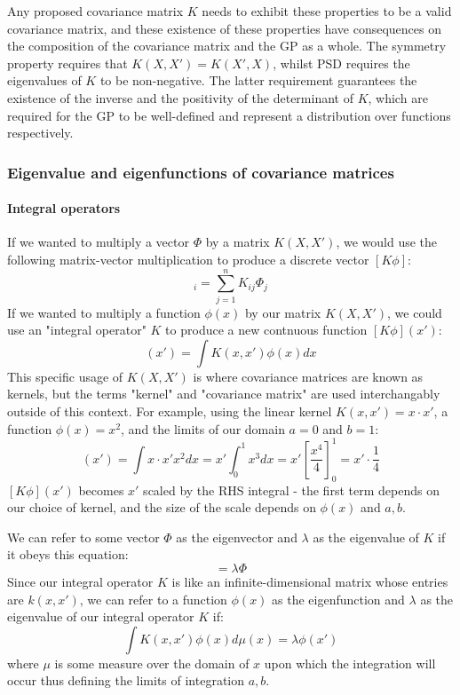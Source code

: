 Any proposed covariance matrix $K$ needs to exhibit these properties to be a valid covariance matrix, and these existence of these properties have consequences on the composition of the covariance matrix and the GP as a whole. The symmetry property requires that $K(X, X') = K(X', X)$, whilst PSD requires the eigenvalues of $K$ to be non-negative. The latter requirement guarantees the existence of the inverse and the positivity of the determinant of $K$, which are required for the GP to be well-defined and represent a distribution over functions respectively.

\subsubsection{Eigenvalue and eigenfunctions of covariance matrices}

\paragraph{Integral operators}
If we wanted to multiply a vector $\Phi$ by a matrix $K(X,X')$, we would use the following matrix-vector multiplication to produce a discrete vector $[K \phi]$:
\begin{equation*}
    [K \phi]_i = \sum_{j=1}^{n} K_{ij} \Phi_j
\end{equation*}
If we wanted to multiply a function $\phi(x)$ by our matrix $K(X,X')$, we could use an "integral operator" $K$ to produce a new contnuous function $[K\phi](x')$:
\begin{equation*}
    [K\phi](x') = \int K(x, x') \phi(x) dx
\end{equation*}
This specific usage of $K(X,X')$ is where covariance matrices are known as kernels, but the terms "kernel" and "covariance matrix" are used interchangably outside of this context. For example, using the linear kernel $K(x, x') = x \cdot x'$, a function $\phi(x) = x^2$, and the limits of our domain $a = 0$ and $b = 1$:
\begin{equation*}
    [K\phi](x') = \int x \cdot x' x^2 dx = x' \int_0^1 x^3 dx = x' [ \frac{x^4}{4} ]_0^1 = x' \cdot \frac{1}{4}
\end{equation*}
$[K\phi](x')$ becomes $x'$ scaled by the RHS integral - the first term depends on our choice of kernel, and the size of the scale depends on $\phi(x)$ and $a, b$.

We can refer to some vector $\Phi$ as the eigenvector and $\lambda$ as the eigenvalue of $K$ if it obeys this equation:
\begin{equation*}
    [K \Phi] = \lambda \Phi
\end{equation*}
Since our integral operator $K$ is like an infinite-dimensional matrix whose entries are $k(x, x')$, we can refer to a function $\phi(x)$ as the eigenfunction and $\lambda$ as the eigenvalue of our integral operator $K$ if:
\begin{equation*}
    \int K(x, x') \phi(x) d\mu(x) = \lambda \phi(x')
\end{equation*}
where $\mu$ is some measure over the domain of $x$ upon which the integration will occur thus defining the limits of integration $a, b$. 

